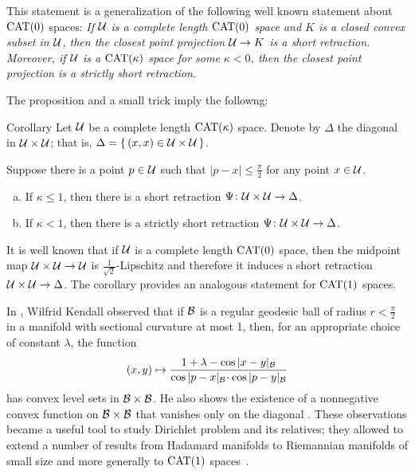 \documentclass[oneside,a4paper, 12pt]{article}
\begin{document}
This statement is a generalization of the following well known statement about $\mathrm{CAT}(0)$ spaces:
\emph{If ${\mathcal{U}}$ is a complete length $\mathrm{CAT}(0)$ space and $K$ is a closed convex subset in ${\mathcal{U}}$,
then the closest point projection ${\mathcal{U}}\to K$ is a short retraction.
Moreover, if $\mathcal{U}$ is a $\mathrm{CAT}(\kappa)$ space for some $\kappa<0$, then  the closest point projection is a strictly short retraction}.

The proposition and a small trick imply the followng:

\begin{thm}{Corollary}\label{cor}
Let $\mathcal{U}$ be a complete length $\mathrm{CAT}(\kappa)$ space.
Denote by $\Delta$ the diagonal in $\mathcal{U}\times \mathcal{U}$;
that is, $\Delta=\{\,(x,x)\in \mathcal{U}\times \mathcal{U}\,\}$.

Suppose there is a point $p\in \mathcal{U}$ such that $|p-x|\le \tfrac\pi2$ for any point $x\in \mathcal{U}$.
\begin{enumerate}[(a)]
\item
If $\kappa\le 1$, then there is a short retraction $\Psi\colon\mathcal{U}\times \mathcal{U}\to \Delta$.
\item If $\kappa<1$, then there is a strictly short retraction $\Psi\colon\mathcal{U}\times \mathcal{U}\to \Delta$.
\end{enumerate}

\end{thm}

It is well known that if $\mathcal{U}$ is a complete length $\mathrm{CAT}(0)$ space, then the midpoint map $\mathcal{U}\times \mathcal{U}\to \mathcal{U}$ is $\tfrac1{\sqrt{2}}$-Lipschitz and therefore it induces a short retraction $\mathcal{U}\times \mathcal{U}\to\Delta$. 
The corollary provides an analogous statement for $\mathrm{CAT}(1)$ spaces.

In \cite[(4.1)]{kendall}, Wilfrid Kendall observed that if $\mathcal{B}$ is a regular geodesic ball of radius $r<\tfrac\pi2$ in a manifold with sectional curvature at most 1, then, for an appropriate choice of constant $\lambda$, the function
\[(x,y)\mapsto 
\frac{1+\lambda-\cos|x-y|_{\spc{B}}}{\cos|p-x|_{\spc{B}}\cdot \cos|p-y|_{\spc{B}}}
\]
has convex level sets in ${\mathcal{B}}\times {\mathcal{B}}$.
He also shows the existence of a nonnegative convex function on ${\mathcal{B}}\times {\mathcal{B}}$ that vanishes only on the diagonal \cite[(4.2)]{kendall}.
These observations became a useful tool to study Dirichlet problem and its relatives;
they allowed to extend a number of results from Hadamard manifolds to Riemannian manifolds of small size
and more generally to $\mathrm{CAT}(1)$ spaces~\cite{yokota,BFHMSZ,fuglede,serbinowski}. 
\end{document}
